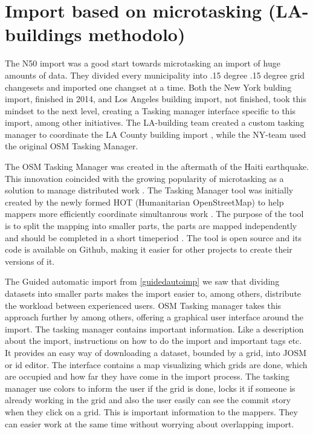 \section{Import based on microtasking (LA-buildings methodolo)}
The N50 import was a good start towards microtasking an import of huge amounts of data. They divided every municipality into .15 degree .15 degree grid changesets and imported one changset at a time. Both the New York bulding import, finished in 2014, and Los Angeles building import, not finished, took this mindset to the next level, creating a Tasking manager interface specific to this import, among other initiatives. The LA-building team created a custom tasking manager to coordinate the LA County building import \cite{OSMTaskingManager}, while the NY-team used the original OSM Tasking Manager. 

The OSM Tasking Manager was created in the aftermath of the Haiti earthquake. This innovation coincided with the growing popularity of microtasking as a solution to manage distributed work \cite{Palen2015}. The Tasking Manager tool was initially created by the newly formed HOT (Humanitarian OpenStreetMap) to help mappers more efficiently coordinate simultanrous work \cite{Palen2015}. The purpose of the tool is to split the mapping into smaller parts, the parts are mapped independently and should be completed in a short timeperiod \cite{HOTa}. The tool is open source and its code is available on Github, making it easier for other projects to create their versions of it. %

The Guided automatic import from \ref{guidedautoimp} we saw that dividing datasets into smaller parts makes the import easier to, among others, distribute the workload between experienced users. OSM Tasking manager takes this approach further by among others, offering a graphical user interface around the import. The tasking manager contains important information. Like a description about the import, instructions on how to do the import and important tags etc. It provides an easy way of downloading a dataset, bounded by a grid, into JOSM or id editor. The interface contains a map visualizing which grids are done, which are occupied and how far they have come in the import process. The tasking manager use colors to inform the user if the grid is done, locks it if someone is already working in the grid and also the user easily can see the commit story when they click on a grid. This is important information to the mappers. They can easier work at the same time without worrying about overlapping import. 


